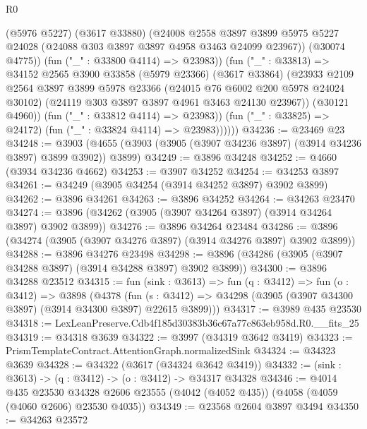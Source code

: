 \begin{lexlean}{R0}
\begin{coremodule}
                    (@5976 @5227)
                    (@3617 @33880)
                    (@24008
                      @2558
                      @3897
                      @3899
                      @5975
                      @5227
                      @24028
                      (@24088 @303 @3897 @3897 @4958 @3463 @24099 @23967))
                    (@30074 @4775))
                  (fun ("_" : @33800 @4114) => @23983))
                (fun ("_" : @33813) =>
                @34152
                  @2565
                  @3900
                  @33858
                  (@5979 @23366)
                  (@3617 @33864)
                  (@23933
                    @2109
                    @2564
                    @3897
                    @3899
                    @5978
                    @23366
                    (@24015 @76 @6002 @200 @5978 @24024 @30102)
                    (@24119 @303 @3897 @3897 @4961 @3463 @24130 @23967))
                  (@30121 @4960))
                (fun ("_" : @33812 @4114) => @23983))
              (fun ("_" : @33825) => @24172)
              (fun ("_" : @33824 @4114) => @23983))))))
@34236 := @23469 @23
@34248 := @3903 (@4655 (@3903 (@3905 (@3907 @34236 @3897) (@3914 @34236 @3897) @3899 @3902)) @3899)
@34249 := @3896 @34248
@34252 := @4660 (@3934 @34236 @4662)
@34253 := @3907 @34252
@34254 := @34253 @3897
@34261 := @34249 (@3905 @34254 (@3914 @34252 @3897) @3902 @3899)
@34262 := @3896 @34261
@34263 := @3896 @34252
@34264 := @34263 @23470
@34274 := @3896 (@34262 (@3905 (@3907 @34264 @3897) (@3914 @34264 @3897) @3902 @3899))
@34276 := @3896 @34264 @23484
@34286 := @3896 (@34274 (@3905 (@3907 @34276 @3897) (@3914 @34276 @3897) @3902 @3899))
@34288 := @3896 @34276 @23498
@34298 := @3896 (@34286 (@3905 (@3907 @34288 @3897) (@3914 @34288 @3897) @3902 @3899))
@34300 := @3896 @34288 @23512
@34315 := fun (sink : @3613) =>
  fun (q : @3412) =>
  fun (o : @3412) =>
  @3898
    (@4378
      (fun (s : @3412) => @34298 (@3905 (@3907 @34300 @3897) (@3914 @34300 @3897) @22615 @3899)))
@34317 := @3989 @435 @23530
@34318 := LexLeanPreserve.Cdb4f185d30383b36c67a77c863eb958d.R0.__fits_25
@34319 := @34318 @3639
@34322 := @3997 (@34319 @3642 @3419)
@34323 := PrismTemplateContract.AttentionGraph.normalizedSink
@34324 := @34323 @3639
@34328 := @34322 (@3617 (@34324 @3642 @3419))
@34332 := (sink : @3613) -> (q : @3412) -> (o : @3412) -> @34317 @34328
@34346 := @4014
    @435
    @23530
    @34328
    @2606
    @23555
    (@4042 (@4052 @435))
    (@4058 (@4059 (@4060 @2606) @23530 @4035))
@34349 := @23568 @2604 @3897 @3494
@34350 := @34263 @23572

\end{coremodule}
\end{lexlean}
